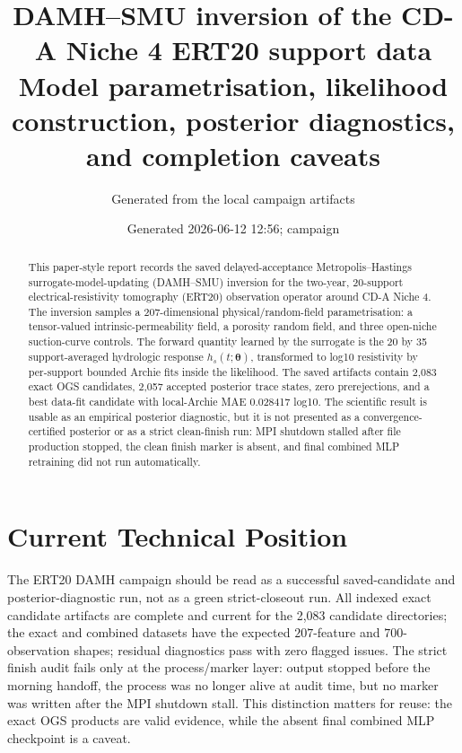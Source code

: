 \documentclass[10pt,a4paper]{article}
\title{\textbf{DAMH--SMU inversion of the CD-A Niche 4 ERT20 support data}\\
\large Model parametrisation, likelihood construction, posterior diagnostics, and completion caveats}
\author{Generated from the local \code{inversion_atempt} campaign artifacts}
\date{Generated 2026-06-12 12:56; campaign \code{damh_ert20_smu_until_20260612_0830_v1}}
\newcommand{\code}[1]{\texttt{\detokenize{#1}}}
\newcommand{\thetas}{\bm\theta}
\begin{document}
\maketitle

\begin{abstract}
This paper-style report records the saved delayed-acceptance Metropolis--Hastings
surrogate-model-updating (DAMH--SMU) inversion for the two-year, 20-support
electrical-resistivity tomography (ERT20) observation operator around CD-A Niche 4.
The inversion samples a 207-dimensional physical/random-field parametrisation:
a tensor-valued intrinsic-permeability field, a porosity random field, and three
open-niche suction-curve controls.  The forward quantity learned by the surrogate is
the 20 by 35 support-averaged hydrologic response \(h_s(t;\thetas)\), transformed to
log10 resistivity by per-support bounded Archie fits inside the likelihood.  The
saved artifacts contain 2,083 exact OGS candidates, 2,057 accepted posterior trace
states, zero prerejections, and a best data-fit candidate
\code{solver01_eval000029} with local-Archie MAE 0.028417
log10.  The scientific result is usable as an empirical posterior diagnostic, but it
is not presented as a convergence-certified posterior or as a strict clean-finish
run: MPI shutdown stalled after file production stopped, the clean finish marker is
absent, and final combined MLP retraining did not run automatically.
\end{abstract}

\section*{Current Technical Position}

The ERT20 DAMH campaign should be read as a successful saved-candidate and
posterior-diagnostic run, not as a green strict-closeout run.  All indexed exact
candidate artifacts are complete and current for the 2,083 candidate directories;
the exact and combined datasets have the expected \(207\)-feature and \(700\)-observation
shapes; residual diagnostics pass with zero flagged issues.  The strict finish audit
fails only at the process/marker layer: output stopped before the morning handoff,
the process was no longer alive at audit time, but no \code{damh_finished} marker
was written after the MPI shutdown stall.  This distinction matters for reuse:
the exact OGS products are valid evidence, while the absent final combined MLP
checkpoint is a caveat.

\tableofcontents
\clearpage
\end{document}
